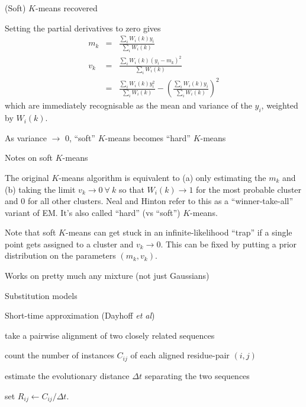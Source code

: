 \documentclass{beamer}
\begin{document}
\begin{frame}{(Soft) $K$-means recovered}

\itemb
 \item Setting the partial derivatives to zero gives
\begin{eqnarray*}
m_k & = & \frac{\sum_i W_i(k) y_i}{\sum_i W_i(k)} \\
v_k & = & \frac{\sum_i W_i(k) (y_i - m_k)^2}{\sum_i W_i(k)} \\
& = & \frac{\sum_i W_i(k) y_i^2}{\sum_i W_i(k)} - \left( \frac{\sum_i W_i(k) y_i}{\sum_i W_i(k)} \right)^2
\end{eqnarray*}
which are immediately recognisable as the mean and variance of the $y_i$, weighted by $W_i(k)$.
\item As variance $\to$ 0, ``soft'' $K$-means becomes ``hard'' $K$-means
\iteme
\end{frame}

\begin{frame}{Notes on soft $K$-means}

\itemb
 \item The original $K$-means algorithm is equivalent to (a) only estimating the $m_k$ and (b) taking the limit $v_k \to 0\ \forall\ k$ so that $W_i(k) \to 1$ for the most probable cluster and $0$ for all other clusters.
Neal and Hinton refer to this as a ``winner-take-all'' variant of EM. It's also called ``hard'' (vs ``soft'') $K$-means.
 \item Note that soft $K$-means can get stuck in an infinite-likelihood ``trap'' if a single point gets assigned to a cluster and $v_k \to 0$.
This can be fixed by putting a prior distribution on the parameters $(m_k,v_k)$.
 \item Works on pretty much any mixture (not just Gaussians)
\iteme

\end{frame}


\begin{frame}{Substitution models}

Short-time approximation (Dayhoff {\em et al})
\itemb
\item take a pairwise alignment of two closely related sequences
\item count the number of instances $C_{ij}$ of each aligned residue-pair $(i,j)$
\item estimate the evolutionary distance $\Delta t$ separating the two sequences
\item set $R_{ij} \leftarrow C_{ij} / \Delta t$.
\iteme
\end{frame}
\end{document}
